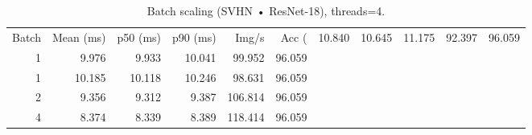 \begin{table}
\caption{Batch scaling (SVHN • ResNet-18), threads=4.}
\label{tab:batch_svhn_resnet18}
\begin{tabular}{rrrrrr}
\toprule
Batch & Mean (ms) & p50 (ms) & p90 (ms) & Img/s & Acc (%
 & 10.840 & 10.645 & 11.175 & 92.397 & 96.059 \\
1 & 9.976 & 9.933 & 10.041 & 99.952 & 96.059 \\
1 & 10.185 & 10.118 & 10.246 & 98.631 & 96.059 \\
2 & 9.356 & 9.312 & 9.387 & 106.814 & 96.059 \\
4 & 8.374 & 8.339 & 8.389 & 118.414 & 96.059 \\
\bottomrule
\end{tabular}
\end{table}
